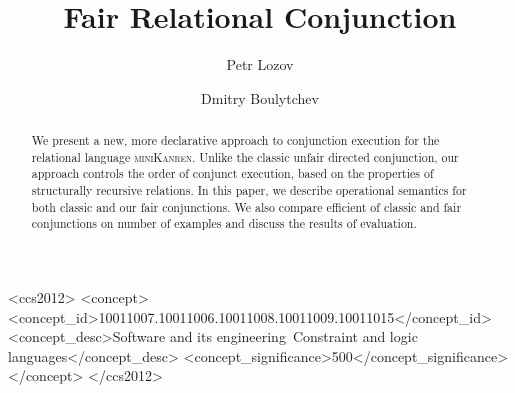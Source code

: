 \documentclass[acmlarge]{acmart}
\newcommand{\mk}{\textsc{miniKanren}\xspace}
\begin{document}
\title{Fair Relational Conjunction}

\author{Petr Lozov}

\author{Dmitry Boulytchev}



\begin{abstract}
  We present a new, more declarative approach to conjunction execution for the relational language \mk. Unlike the classic unfair directed conjunction, our approach controls the order of conjunct execution, based on the properties of structurally recursive relations. In this paper, we describe operational semantics for both classic and our fair conjunctions. We also compare efficient of classic and fair conjunctions on number of examples and discuss the results of evaluation.
\end{abstract}

\begin{CCSXML}
<ccs2012>
<concept>
<concept_id>10011007.10011006.10011008.10011009.10011015</concept_id>
<concept_desc>Software and its engineering~Constraint and logic languages</concept_desc>
<concept_significance>500</concept_significance>
</concept>
</ccs2012>
\end{CCSXML}



\maketitle

\thispagestyle{empty}











\end{document}

